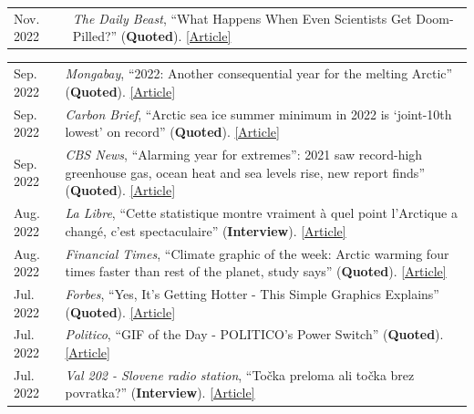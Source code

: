 \documentclass[margin,line,palatino,courier,10pt]{res}
\begin{document}
\begin{resume}
\begin{tabular}{@{}p{0.9in}p{4in}}
Nov. 2022 & \textit{The Daily Beast}, ``What Happens When Even Scientists Get Doom-Pilled?'' (\textbf{Quoted}). \href{https://www.thedailybeast.com/how-climate-change-doomerism-is-even-taking-over-scientists}{[Article]}\\
\end{tabular}
\begin{tabular}{@{}p{0.9in}p{4in}}
Sep. 2022 & \textit{Mongabay}, ``2022: Another consequential year for the melting Arctic'' (\textbf{Quoted}). \href{https://news.mongabay.com/2022/09/2022-another-consequential-year-for-the-melting-arctic/}{[Article]}\\
Sep. 2022 & \textit{Carbon Brief}, ``Arctic sea ice summer minimum in 2022 is `joint-10th lowest' on record'' (\textbf{Quoted}). \href{https://www.carbonbrief.org/arctic-sea-ice-summer-minimum-in-2022-is-joint-10th-lowest-on-record/}{[Article]}\\
Sep. 2022 & \textit{CBS News}, ``Alarming year for extremes'': 2021 saw record-high greenhouse gas, ocean heat and sea levels rise, new report finds'' (\textbf{Quoted}). \href{https://www.cbsnews.com/news/2021-record-high-greenhouse-gases-ocean-heat-and-sea-level-rise-extreme-heat/}{[Article]}\\
Aug. 2022 & \textit{La Libre}, ``Cette statistique montre vraiment \`{a} quel point l'Arctique a chang\'{e}, c'est spectaculaire'' (\textbf{Interview}). \href{https://www.lalibre.be/planete/environnement/2022/08/17/cette-statistique-montre-vraiment-a-quel-point-larctique-a-change-cest-spectaculaire-FGU5ABQZB5F6XINIL5ZBBB3CXM/}{[Article]}\\
Aug. 2022 & \textit{Financial Times}, ``Climate graphic of the week: Arctic warming four times faster than rest of the planet, study says'' (\textbf{Quoted}). \href{https://www.ft.com/content/9bb32c6f-b3dc-46bd-944e-9e583407b866}{[Article]}\\
Jul. 2022 & \textit{Forbes}, ``Yes, It’s Getting Hotter - This Simple Graphics Explains'' (\textbf{Quoted}). \href{https://www.forbes.com/sites/marshallshepherd/2022/07/19/yes-its-getting-hotterthis-simple-graphics-explains/}{[Article]}\\
Jul. 2022 & \textit{Politico}, ``GIF of the Day - POLITICO's Power Switch'' (\textbf{Quoted}). \href{https://www.politico.com/newsletters/power-switch/2022/07/15/time-for-bidens-beast-mode-00046061}{[Article]}\\
Jul. 2022 & \textit{Val 202 - Slovene radio station}, ``To\v{c}ka preloma ali to\v{c}ka brez povratka?'' (\textbf{Interview}). \href{https://val202.rtvslo.si/podkast/vroci-mikrofon/584/174886447}{[Article]}\\

\end{tabular}
\end{resume}
\end{document}
